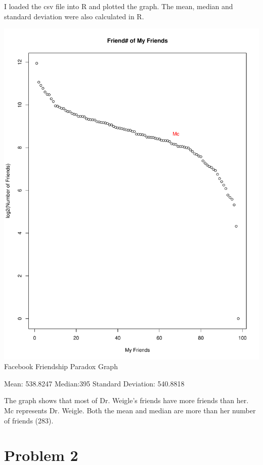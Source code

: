 \documentclass[letterpaper,12pt]{article}
\begin{document}
I loaded the csv file into R and plotted the graph. The mean, median and standard deviation were also calculated in R.  
\vspace{2mm}

\vspace{2mm}
        \includegraphics[scale=0.35]{FacebookPlot.pdf}\\
        \caption{Facebook Friendship Paradox Graph}
        \label{Facebook Friendship Paradox Graph}
        \vspace{10mm}

Mean: 538.8247
Median:395
Standard Deviation: 540.8818
\vspace{2mm}

The graph shows that most of Dr. Weigle's friends have more friends than her. Mc represents Dr. Weigle. Both the mean and median are more than her number of friends (283).

\section{Problem 2}
\end{document}
